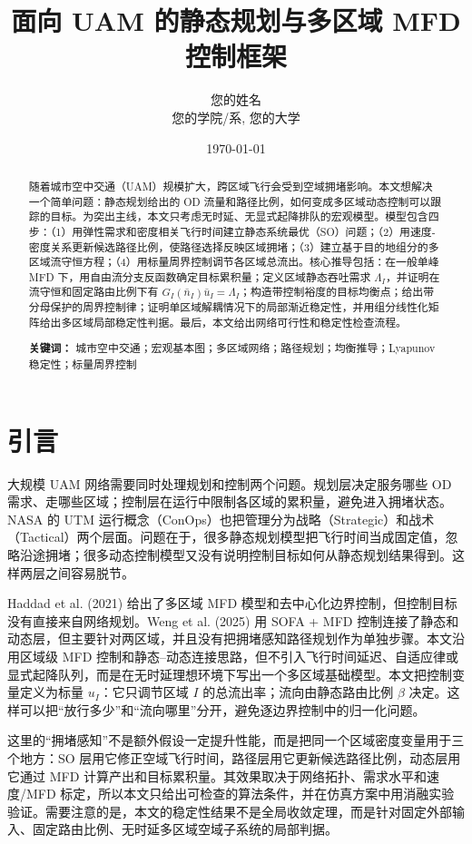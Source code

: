 \documentclass[a4paper,12pt]{article}
\title{\textbf{面向 UAM 的静态规划与多区域 MFD 控制框架}}
\author{您的姓名 \\ 您的学院/系, 您的大学}
\date{\today}
\theoremstyle{plain}
\theoremstyle{definition}
\theoremstyle{remark}
\begin{document}
\maketitle

\begin{abstract}
随着城市空中交通（UAM）规模扩大，跨区域飞行会受到空域拥堵影响。本文想解决一个简单问题：静态规划给出的 OD 流量和路径比例，如何变成多区域动态控制可以跟踪的目标。为突出主线，本文只考虑无时延、无显式起降排队的宏观模型。模型包含四步：（1）用弹性需求和密度相关飞行时间建立静态系统最优（SO）问题；（2）用速度-密度关系更新候选路径比例，使路径选择反映区域拥堵；（3）建立基于目的地组分的多区域流守恒方程；（4）用标量周界控制调节各区域总流出。核心推导包括：在一般单峰 MFD 下，用自由流分支反函数确定目标累积量；定义区域静态吞吐需求 $\Lambda_I$，并证明在流守恒和固定路由比例下有 $G_I(\bar n_I)\bar u_I=\Lambda_I$；构造带控制裕度的目标均衡点；给出带分母保护的周界控制律；证明单区域解耦情况下的局部渐近稳定性，并用组分线性化矩阵给出多区域局部稳定性判据。最后，本文给出网络可行性和稳定性检查流程。

\textbf{关键词：} 城市空中交通；宏观基本图；多区域网络；路径规划；均衡推导；Lyapunov 稳定性；标量周界控制
\end{abstract}

\section{引言}
大规模 UAM 网络需要同时处理规划和控制两个问题。规划层决定服务哪些 OD 需求、走哪些区域；控制层在运行中限制各区域的累积量，避免进入拥堵状态。NASA 的 UTM 运行概念（ConOps）也把管理分为战略（Strategic）和战术（Tactical）两个层面。问题在于，很多静态规划模型把飞行时间当成固定值，忽略沿途拥堵；很多动态控制模型又没有说明控制目标如何从静态规划结果得到。这样两层之间容易脱节。

Haddad et al. (2021) 给出了多区域 MFD 模型和去中心化边界控制，但控制目标没有直接来自网络规划。Weng et al. (2025) 用 SOFA + MFD 控制连接了静态和动态层，但主要针对两区域，并且没有把拥堵感知路径规划作为单独步骤。本文沿用区域级 MFD 控制和静态--动态连接思路，但不引入飞行时间延迟、自适应律或显式起降队列，而是在无时延理想环境下写出一个多区域基础模型。本文把控制变量定义为标量 $u_I$：它只调节区域 $I$ 的总流出率；流向由静态路由比例 $\beta$ 决定。这样可以把“放行多少”和“流向哪里”分开，避免逐边界控制中的归一化问题。

这里的“拥堵感知”不是额外假设一定提升性能，而是把同一个区域密度变量用于三个地方：SO 层用它修正空域飞行时间，路径层用它更新候选路径比例，动态层用它通过 MFD 计算产出和目标累积量。其效果取决于网络拓扑、需求水平和速度/MFD 标定，所以本文只给出可检查的算法条件，并在仿真方案中用消融实验验证。需要注意的是，本文的稳定性结果不是全局收敛定理，而是针对固定外部输入、固定路由比例、无时延多区域空域子系统的局部判据。
\end{document}
